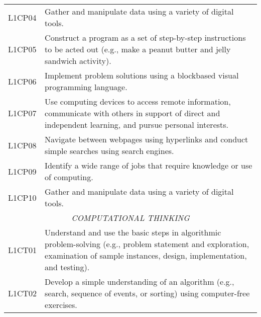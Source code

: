 \begin{longtable}{p{1.8cm}p{11cm}}
 L1CP04  & Gather and manipulate data using a variety of digital tools.                                                                                                                                                               \\
 L1CP05  & Construct a program as a set of step-by-step instructions to be acted out (e.g., make a peanut butter and jelly sandwich activity).                                                                                        \\
 L1CP06  & Implement problem solutions using a blockbased visual programming language.                                                                                                                                                \\
 L1CP07  & Use computing devices to access remote information, communicate with others in support of direct and independent learning, and pursue personal interests.                                                                  \\
 L1CP08  & Navigate between webpages using hyperlinks and conduct simple searches using search engines.                                                                                                                               \\
 L1CP09  & Identify a wide range of jobs that require knowledge or use of computing.                                                                                                                                                  \\
 L1CP10  & Gather and manipulate data using a variety of digital tools.                                                                                                                                                               \\
 \multicolumn{2}{c}{\textit{COMPUTATIONAL THINKING}}                                                                                                                                                                                                     \\
 L1CT01  & Understand and use the basic steps in algorithmic problem-solving (e.g., problem statement and exploration, examination of sample instances, design, implementation, and testing).                                         \\
 L1CT02  & Develop a simple understanding of an algorithm (e.g., search, sequence of events, or sorting) using computer-free exercises.                                                                                               \\

\end{longtable}
